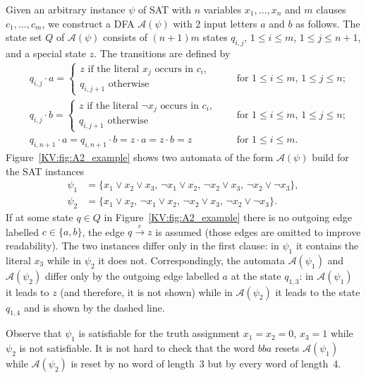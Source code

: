 \documentclass{irmaart}
\theoremstyle{plain}
\begin{document}
Given an arbitrary instance $\psi$ of \textsc{SAT} with $n$
variables $x_1,\dots,x_n$ and $m$ clauses $c_1,\dots,c_m$, we
construct a DFA $\mathcal{A}(\psi)$ with 2 input letters $a$ and
$b$ as follows. The state set $Q$ of $\mathcal{A}(\psi)$ consists
of $(n+1)m$ states $q_{i,j}$, $1 \le i \le m$, $1 \le j \le n+1$,
and a special state $z$. The transitions are defined by
\begin{align*}
& q_{i,j}\cdot a =
\begin{cases}
    z \text{ if the literal $x_j$ occurs in $c_i$},\\
    q_{i,j+1} \text{ otherwise}
\end{cases} && \text{ for $1 \le i \le m$, $1 \le j \le n$;} \\
&q_{i,j}\cdot b =
\begin{cases}
    z \text{ if the literal $\neg x_j$ occurs in $c_i$},\\
    q_{i,j+1} \text{ otherwise}
\end{cases} && \text{ for $1 \le i \le m$, $1 \le j \le n$;} \\
&q_{i,n+1}\cdot a=q_{i,n+1}\cdot b =z\cdot a=z\cdot b=z && \text{ for $1\le
i\le m$.}
\end{align*}
Figure~\ref{KV:fig:A2_example} shows two automata of the form
$\mathcal{A}(\psi)$ build for the \textsc{SAT} instances
\begin{align*}
\psi_1&=\{x_1 \vee x_2 \vee x_3,\, \neg x_1 \vee x_2,\, \neg x_2
\vee x_3,\,\neg x_2 \vee \neg x_3\},\\
\psi_2&=\{x_1 \vee x_2,\,\neg x_1 \vee x_2,\, \neg x_2 \vee
x_3,\,\neg x_2 \vee \neg x_3\}.
\end{align*}
If at some state $q\in Q$ in Figure~\ref{KV:fig:A2_example} there
is no outgoing edge labelled $c\in\{a,b\}$, the edge
$q\stackrel{c}{\to}z$ is assumed (those edges are omitted to
improve readability). The two instances differ only in the first
clause: in $\psi_1$ it contains the literal $x_3$ while in
$\psi_2$ it does not. Correspondingly, the automata
$\mathcal{A}(\psi_1)$ and $\mathcal{A}(\psi_2)$ differ only by the
outgoing edge labelled $a$ at the state $q_{1,3}$: in
$\mathcal{A}(\psi_1)$ it leads to $z$ (and therefore, it is not
shown) while in $\mathcal{A}(\psi_2)$ it leads to the state
$q_{1,4}$ and is shown by the dashed line.

Observe that $\psi_1$ is satisfiable for the truth assignment
$x_1=x_2=0$, $x_3=1$ while $\psi_2$ is not satisfiable. It is not
hard to check that the word $bba$ resets $\mathcal{A}(\psi_1)$
while $\mathcal{A}(\psi_2)$ is reset by no word of length~3 but by
every word of length~4.
\end{document}
